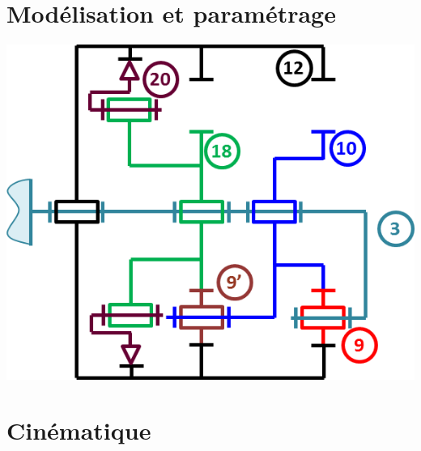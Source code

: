 \documentclass[10pt,fleqn]{article} %
\begin{document}






\section{Modélisation et paramétrage}

\begin{minipage}[c]{.47\linewidth}
\begin{center}
\includegraphics[width=\linewidth]{images/schema_cinematique}
\end{center}
\end{minipage} \hfill
\begin{minipage}[c]{.47\linewidth}
\begin{center}
\end{center}
\end{minipage}
\section{Cinématique}



\end{document}
